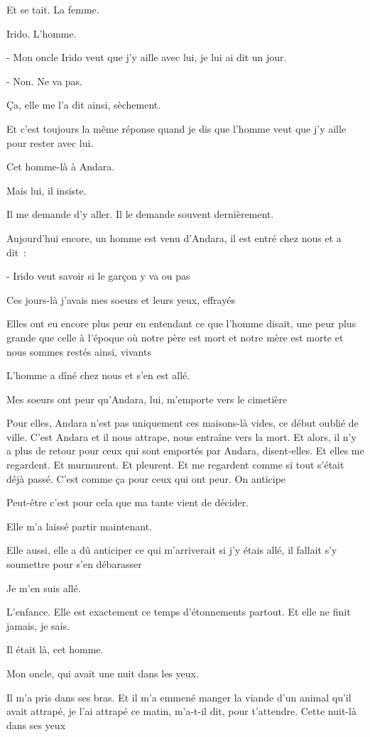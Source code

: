 Et se tait. La femme.

Irido. L'homme.

- Mon oncle Irido veut que j'y aille avec lui, je lui ai dit un jour.

- Non. Ne va pas.

Ça, elle me l'a dit ainsi, sèchement.

Et c'est toujours la même réponse quand je dis que l'homme veut que j'y
aille pour rester avec lui.

Cet homme-là à Andara.

Mais lui, il insiste.

Il me demande d'y aller. Il le demande souvent dernièrement.

Aujourd'hui encore, un homme est venu d'Andara, il est entré chez nous
et a dit~:

- Irido veut savoir si le garçon y va ou pas

Ces jours-là j'avais mes soeurs et leurs yeux, effrayés

Elles ont eu encore plus peur en entendant ce que l'homme disait, une
peur plus grande que celle à l'époque où notre père est mort et notre
mère est morte et nous sommes restés ainsi, vivants

L'homme a dîné chez nous et s'en est allé.

Mes soeurs ont peur qu'Andara, lui, m'emporte vers le cimetière

Pour elles, Andara n'est pas uniquement ces maisons-là vides, ce début
oublié de ville. C'est Andara et il nous attrape, nous entraîne vers la
mort. Et alors, il n'y a plus de retour pour ceux qui sont emportés par
Andara, disent-elles. Et elles me regardent. Et murmurent. Et pleurent.
Et me regardent comme si tout s'était déjà passé. C'est comme ça pour
ceux qui ont peur. On anticipe

Peut-être c'est pour cela que ma tante vient de décider.

Elle m'a laissé partir maintenant.

Elle aussi, elle a dû anticiper ce qui m'arriverait si j'y étais allé,
il fallait s'y soumettre pour s'en débarasser

Je m'en suis allé.

L'enfance. Elle est exactement ce temps d'étonnements partout. Et elle
ne finit jamais, je sais.

Il était là, cet homme.

Mon oncle, qui avait une nuit dans les yeux.

Il m'a pris dans ses bras. Et il m'a emmené manger la viande d'un animal
qu'il avait attrapé, je l'ai attrapé ce matin, m'a-t-il dit, pour
t'attendre. Cette nuit-là dans ses yeux

